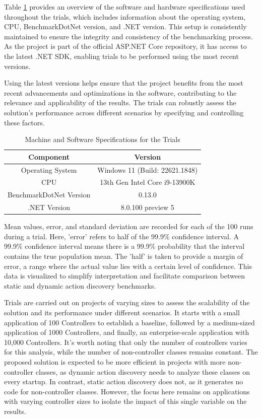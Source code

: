 Table \ref{table:specifications} provides an overview of the software and hardware specifications used throughout the trials, which includes information about the operating system, CPU, BenchmarkDotNet version, and .NET version. This setup is consistently maintained to ensure the integrity and consistency of the benchmarking process. As the project is part of the official ASP.NET Core repository, it has access to the latest .NET SDK, enabling trials to be performed using the most recent versions.

Using the latest versions helps ensure that the project benefits from the most recent advancements and optimizations in the software, contributing to the relevance and applicability of the results. The trials can robustly assess the solution's performance across different scenarios by specifying and controlling these factors.

\begin{table}[h!]
\centering
\begin{tabular}{|c|c|}
\hline
\textbf{Component} & \textbf{Version} \\
\hline
Operating System & Windows 11 (Build: 22621.1848) \\
\hline
CPU & 13th Gen Intel Core i9-13900K \\
\hline
BenchmarkDotNet Version & 0.13.0 \\
\hline
.NET Version & 8.0.100 preview 5 \\
\hline
\end{tabular}
\caption{Machine and Software Specifications for the Trials}
\label{table:specifications}
\end{table}

Mean values, error, and standard deviation are recorded for each of the 100 runs during a trial. Here, 'error' refers to half of the 99.9\% confidence interval. A 99.9\% confidence interval means there is a 99.9\% probability that the interval contains the true population mean. The 'half' is taken to provide a margin of error, a range where the actual value lies with a certain level of confidence. This data is visualized to simplify interpretation and facilitate comparison between static and dynamic action discovery benchmarks.

Trials are carried out on projects of varying sizes to assess the scalability of the solution and its performance under different scenarios. It starts with a small application of 100 Controllers to establish a baseline, followed by a medium-sized application of 1000 Controllers, and finally, an enterprise-scale application with 10,000 Controllers. It's worth noting that only the number of controllers varies for this analysis, while the number of non-controller classes remains constant. The proposed solution is expected to be more efficient in projects with more non-controller classes, as dynamic action discovery needs to analyze these classes on every startup. In contrast, static action discovery does not, as it generates no code for non-controller classes. However, the focus here remains on applications with varying controller sizes to isolate the impact of this single variable on the results.

